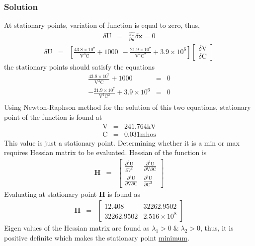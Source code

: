 \documentclass[]{report}
\begin{document}
\subsubsection*{Solution}
At stationary points, variation of function is equal to zero, thus,
\begin{eqnarray*}
\delta \mathrm U &=&\frac{\partial \mathrm U}{\partial \mathbf x} \delta \mathbf{x} =0
\end{eqnarray*}
\begin{eqnarray*}
\delta \mathrm U &=&\left[\frac{43.8\times 10^7}{\mathrm V^3 \mathrm C}+1000 \ \ - \frac{21.9\times 10^7}{\mathrm V^2 \mathrm C^2}+3.9\times 10^6\right] \left[\begin{array}{c}\delta \mathrm V \\ \delta \mathrm C \end{array}\right]
\end{eqnarray*}
the stationary points should satisfy the equations
\begin{eqnarray*}
\frac{43.8\times 10^7}{\mathrm V^3 \mathrm C}+1000 &=&0 \\
- \frac{21.9\times 10^7}{\mathrm V^2 \mathrm C^2}+3.9\times 10^6 &=&0 \\
\end{eqnarray*}
Using Newton-Raphson method for the solution of this two equations, stationary point of the function is found at
\begin{eqnarray*}
\mathrm V &=& 241.764 \mathrm {kV} \\
\mathrm C &=& 0.031 \mathrm {mhos}
\end{eqnarray*}
This value is just a stationary point. Determining whether it is a min or max requires Hessian matrix to be evaluated. Hessian of the function is
\begin{eqnarray*}
\mathbf H &=& \left[ \begin{array}{cc}
\frac{\partial^2 \mathrm U}{\partial  V^2} &\frac{\partial^2 \mathrm U}{\partial \mathrm V \partial \mathrm C}\\
\frac{\partial^2 \mathrm U}{\partial \mathrm V \partial \mathrm C} & \frac{\partial^2 \mathrm U}{\partial \mathrm C^2}
\end{array}\right]
\end{eqnarray*}
Evaluating at stationary point \textbf{H} is found as
\begin{eqnarray*}
\mathbf H &=& \left[ \begin{array}{cc}
12.408 &32262.9502\\
32262.9502 & 2.516\times10^8
\end{array}\right]
\end{eqnarray*}
Eigen values of the Hessian matrix are found as $\lambda_1 >0\;\&\;\lambda_2 >0$, thus, it is positive definite which makes the stationary point \underline{minimum}.
\end{document}
